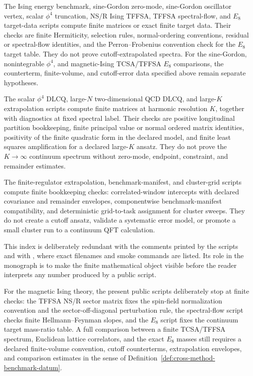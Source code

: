 \begin{description}[leftmargin=2em,labelindent=0pt,labelsep=0.5em,style=nextline]
\item[Hamiltonian truncation and TCSA/TFFSA matrices.]
The Ising energy benchmark, sine-Gordon zero-mode, sine-Gordon oscillator
vertex, scalar \(\phi^4\) truncation, NS/R Ising TFFSA,
TFFSA spectral-flow, and \(E_8\) target-data scripts compute finite matrices
or exact finite target data.  Their checks are finite Hermiticity,
selection rules, normal-ordering conventions, residual or spectral-flow
identities, and the Perron--Frobenius convention check for the \(E_8\) target
table.  They do not prove cutoff-extrapolated spectra.  For the sine-Gordon,
nonintegrable \(\phi^4\), and magnetic-Ising TCSA/TFFSA \(E_8\) comparisons,
the counterterm, finite-volume, and cutoff-error data specified above remain
separate hypotheses.

\item[DLCQ and light-front finite matrices.]
The scalar \(\phi^4\) DLCQ, large-\(N\) two-dimensional QCD DLCQ, and
large-\(K\) extrapolation scripts compute finite matrices at harmonic
resolution \(K\), together with diagnostics at fixed spectral label.  Their
checks are positive longitudinal partition bookkeeping, finite
principal value or normal ordered matrix identities, positivity of the finite
quadratic form in the declared model, and finite least squares amplification
for a declared large-\(K\) ansatz.  They do not prove the \(K\to\infty\) continuum
spectrum without zero-mode, endpoint, constraint, and remainder estimates.

\item[Extrapolation, manifests, and cluster wrappers.]
The finite-regulator extrapolation, benchmark-manifest, and cluster-grid
scripts compute finite bookkeeping checks: correlated-window intercepts
with declared covariance and remainder envelopes, componentwise
benchmark-manifest compatibility, and deterministic grid-to-task assignment
for cluster sweeps.  They do not create a cutoff ansatz, validate a
systematic error model, or promote a small cluster run to a continuum QFT
calculation.
\end{description}

This index is deliberately redundant with the comments printed by the
scripts and with , where exact filenames and
smoke commands are listed.  Its role in the monograph is to make the finite
mathematical object visible before the reader interprets any number produced
by a public script.

For the magnetic Ising theory, the present public scripts deliberately stop
at finite checks: the TFFSA NS/R sector matrix fixes the spin-field
normalization convention and the sector-off-diagonal perturbation rule, the
spectral-flow script checks finite Hellmann--Feynman slopes, and the \(E_8\)
script fixes the continuum target mass-ratio table.  A full comparison
between a finite TCSA/TFFSA spectrum,
Euclidean lattice correlators, and the exact \(E_8\) masses still requires a
declared finite-volume convention, cutoff counterterms, extrapolation
envelopes, and comparison estimates in the sense of
Definition~\ref{def:cross-method-benchmark-datum}.

